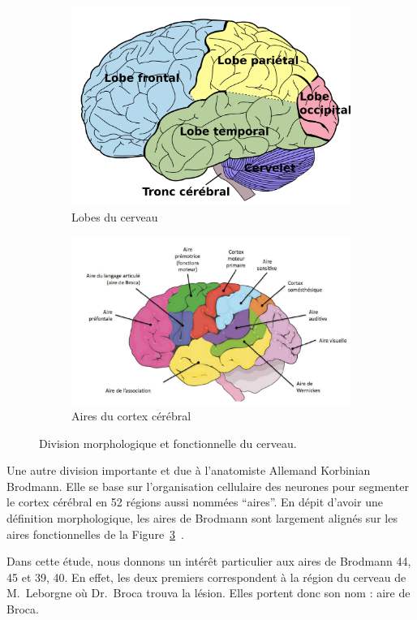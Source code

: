 \begin{figure}[htb]
    \begin{center}

        \begin{subfigure}{.38\linewidth}
            \includegraphics[width=\linewidth]{assets/images/lobes.png}
            \caption{Lobes du cerveau~\cite{}}
            \label{fig.lobes}
        \end{subfigure}
        \begin{subfigure}{.52\linewidth}
            \includegraphics[width=\linewidth]{assets/images/areas.png}
            \caption{Aires du cortex cérébral~\cite{}}
            \label{fig.brain-areas}
        \end{subfigure}
        
        
    \end{center}
    \caption{Division morphologique et fonctionnelle du cerveau.}
\end{figure}

Une autre division importante et due à l'anatomiste Allemand Korbinian Brodmann.
Elle se base sur l'organisation cellulaire des neurones pour segmenter le cortex cérébral en 52 régions 
aussi nommées ``aires''.
En dépit d'avoir une définition morphologique, 
les aires de Brodmann sont largement alignés sur les aires fonctionnelles 
de la Figure~\ref{fig.brain-areas}~\cite{Brodmann_2007}.

Dans cette étude, nous donnons un intérêt particulier aux aires de Brodmann 44, 45 et 39, 40.
En effet, les deux premiers correspondent à la région du cerveau de M.~Leborgne où Dr.~Broca trouva la lésion.
Elles portent donc son nom : aire de Broca.